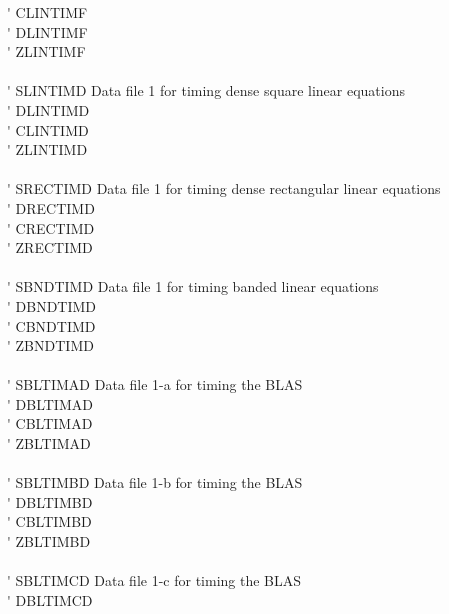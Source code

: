 \begin{tabbing}
 \> \titem \' \> CLINTIMF \> \\
 \> \titem \' \> DLINTIMF \> \\
 \> \titem \' \> ZLINTIMF \> \\
\vspace{0.1ex} \\
 \> \titem \' \> SLINTIMD\> Data file 1 for timing dense square linear equations \\
 \> \titem \' \> DLINTIMD\> \\
 \> \titem \' \> CLINTIMD \> \\
 \> \titem \' \> ZLINTIMD \> \\
\vspace{0.1ex} \\
 \> \titem \' \> SRECTIMD\> Data file 1 for timing dense rectangular linear equations \\
 \> \titem \' \> DRECTIMD\> \\
 \> \titem \' \> CRECTIMD \> \\
 \> \titem \' \> ZRECTIMD \> \\
\vspace{0.1ex} \\
 \> \titem \' \> SBNDTIMD\> Data file 1 for timing banded linear equations \\
 \> \titem \' \> DBNDTIMD \> \\
 \> \titem \' \> CBNDTIMD \> \\
 \> \titem \' \> ZBNDTIMD \> \\
\vspace{0.1ex} \\
 \> \titem \' \> SBLTIMAD\> Data file 1-a for timing the BLAS \\
 \> \titem \' \> DBLTIMAD \> \\
 \> \titem \' \> CBLTIMAD \> \\
 \> \titem \' \> ZBLTIMAD \> \\
\vspace{0.1ex} \\
 \> \titem \' \> SBLTIMBD\> Data file 1-b for timing the BLAS \\
 \> \titem \' \> DBLTIMBD \> \\
 \> \titem \' \> CBLTIMBD \> \\
 \> \titem \' \> ZBLTIMBD \> \\
\vspace{0.1ex} \\
 \> \titem \' \> SBLTIMCD\> Data file 1-c for timing the BLAS \\
 \> \titem \' \> DBLTIMCD \> \\

\end{tabbing}
